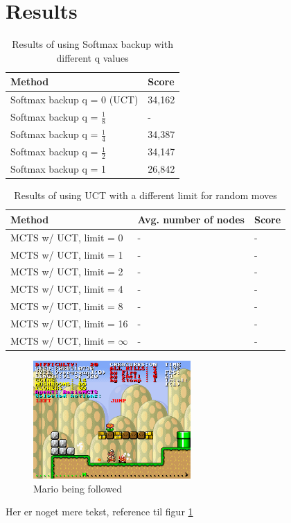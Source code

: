 \documentclass[10pt,a4paper]{article}
\begin{document}
\section{Results}
\renewcommand{\arraystretch}{1.5}
\begin{table}[h]
	\centering
	\begin{tabular}{| l | l |}
		\hline
		\textbf{Method} & \textbf{Score} \\ \hline
		Softmax backup q = 0 (UCT) & 34,162 \\ \hline
		Softmax backup q = $\frac{1}{8}$ & - \\ \hline
		Softmax backup q = $\frac{1}{4}$ & 34,387 \\ \hline
		Softmax backup q = $\frac{1}{2}$ & 34,147 \\ \hline
		Softmax backup q = 1 & 26,842 \\ \hline
	\end{tabular}
	\caption{Results of using Softmax backup with different q values}
	\label{tab:softmax_results}
\end{table}
\begin{table}[h]
	\centering
	\begin{tabular}{| l | l | l |}
		\hline
		\textbf{Method} & \textbf{Avg. number of nodes} & \textbf{Score} \\ \hline
		MCTS w/ UCT, limit = 0			& - & - \\ \hline
		MCTS w/ UCT, limit = 1			& - & - \\ \hline
		MCTS w/ UCT, limit = 2			& - & - \\ \hline
		MCTS w/ UCT, limit = 4			& - & - \\ \hline
		MCTS w/ UCT, limit = 8			& - & - \\ \hline
		MCTS w/ UCT, limit = 16			& - & - \\ \hline
		MCTS w/ UCT, limit = $\infty$	& - & - \\ \hline
	\end{tabular}
	\caption{Results of using UCT with a different limit for random moves}
	\label{tab:uct_results}
\end{table}
\begin{figure}[h]
\centering
\includegraphics[width=6cm]{img/Forfulgt}
\caption{Mario being followed}
\label{fig:followed}
\end{figure}
Her er noget mere tekst, reference til figur \ref{fig:followed}
\clearpage
\end{document}
